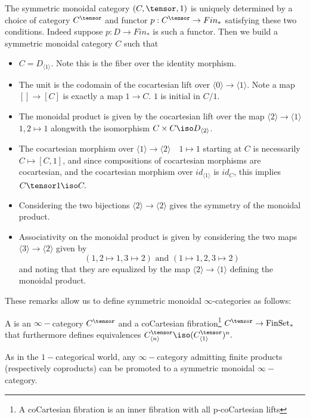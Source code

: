 The symmetric monoidal category $(C,\tensor, 1)$ is uniquely determined by a choice of category $C^\tensor$ and functor $p:C^\tensor \rightarrow Fin_*$ satisfying these two conditions. Indeed suppose $p:D\rightarrow Fin_*$ is such a functor. Then we build a symmetric monoidal category $C$ such that
\begin{itemize}
    \item $C=D_{\langle 1 \rangle}$. Note this is the fiber over the identity morphism.
    \item The unit is the codomain of the cocartesian lift over $\langle 0\rangle \rightarrow \langle 1 \rangle $. Note a map $[]\rightarrow [C]$ is exactly a map $1\rightarrow C$. $1$ is initial in $C/1.$
    \item The monoidal product is given by the cocartesian lift over the map $\langle 2\rangle \rightarrow \langle 1\rangle$ $1,2\mapsto 1$ alongwith the isomorphism $C\times C \iso D_{\langle 2 \rangle}$.
    \item The cocartesian morphism over $\langle 1\rangle \rightarrow \langle 2\rangle \quad 1\mapsto 1$ starting at $C$ is necessarily $C\mapsto [C,1]$, and since compositions of cocartesian morphisms are cocartesian, and the cocartesian morphism over $id_{\langle 1\rangle}$ is $id_C$, this implies $C\tensor 1\iso C.$
    \item Considering the two bijections $\langle 2\rangle \rightarrow \langle 2 \rangle$ gives the symmetry of the monoidal product.
    \item Associativity on the monoidal product is given by considering the two maps $\langle 3\rangle \rightarrow \langle 2 \rangle$ given by
    $$(1,2\mapsto 1,3\mapsto 2) \text{  and  } (1\mapsto 1, 2,3\mapsto 2)$$
    and noting that they are equalized by the map $\langle 2 \rangle \rightarrow \langle 1\rangle$ defining the monoidal product.
\end{itemize}

These remarks allow us to define symmetric monoidal $\infty$-categories as follows:
\begin{definition}
    A  is an $\infty-$category $C^\tensor$ and a coCartesian fibration\footnote{A coCartesian fibration is an inner fibration with all p-coCartesian lifts} $C^\tensor \rightarrow \text{FinSet}_*$ that furthermore defines equivalences $C^\tensor_{\langle n \rangle}\iso (C^\tensor_{\langle 1 \rangle})^n.$
\end{definition}

As in the $1-$categorical world, any $\infty-$category admitting finite products (respectively coproducts) can be promoted to a symmetric monoidal $\infty-$category.

